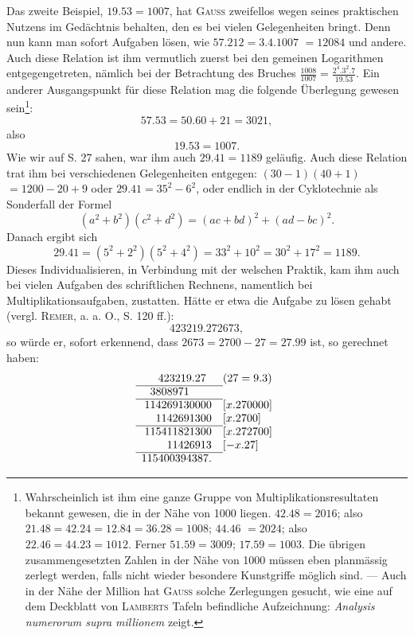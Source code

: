 Das zweite Beispiel, $19\mathord{.}53=1007$, hat \textsc{Gauss} zweifellos wegen seines
praktischen Nutzens im Gedächtnis behalten, den es bei vielen Gelegenheiten
bringt. Denn nun kann man sofort Aufgaben lösen, wie $57\mathord{.}212=3\mathord{.}4\mathord{.}1007$
$=12084$ und andere. Auch diese Relation ist ihm vermutlich zuerst bei den
gemeinen Logarithmen entgegengetreten, nämlich bei der Betrachtung des
Bruches $\frac{1008}{1007}=\frac{2^4\mathord{.}3^2\mathord{.}7}{19\mathord{.}53}$. Ein anderer Ausgangspunkt für diese Relation mag
\clearpage{}
\setcounter{footnote}{0}
\noindent die folgende Überlegung gewesen sein\footnote{Wahrscheinlich ist ihm eine ganze Gruppe von Multiplikationsresultaten bekannt gewesen, die in
der Nähe von 1000 liegen. $42\mathord{.}48=2016$; also $21\mathord{.}48=42\mathord{.}24=12\mathord{.}84=36\mathord{.}28=1008$; $44\mathord{.}46$
$=2024$; also $22\mathord{.}46=44\mathord{.}23=1012$. Ferner $51\mathord{.}59=3009$; $17\mathord{.}59=1003$. Die übrigen zusammengesetzten Zahlen in der Nähe von 1000 müssen eben planmässig zerlegt werden, falls nicht wieder besondere Kunstgriffe möglich sind. — Auch in der Nähe der Million hat \textsc{Gauss} solche Zerlegungen gesucht,
wie eine auf dem Deckblatt von \textsc{Lamberts} Tafeln befindliche Aufzeichnung: \textit{Analysis numerorum supra
millionem} zeigt.}:
\[
57\mathord{.}53=50\mathord{.}60+21=3021,
\]
\noindent also
\[
19\mathord{.}53=1007.
\]
\noindent Wie wir auf S. 27 sahen, war ihm auch $29\mathord{.}41=1189$ geläufig. Auch diese
Relation trat ihm bei verschiedenen Gelegenheiten entgegen: $(30-1)(40+1)$
$=1200-20+9$ oder $29\mathord{.}41=35^2-6^2$, oder endlich in der Cyklotechnie als
Sonderfall der Formel
\[
(a^2+b^2)(c^2+d^2)=(ac+bd)^2+(ad-bc)^2.
\]
\noindent Danach ergibt sich
\[
29\mathord{.}41=(5^2+2^2)(5^2+4^2)=33^2+10^2=30^2+17^2=1189.
\]
\noindent Dieses Individualisieren, in Verbindung mit der welschen Praktik, kam ihm
auch bei vielen Aufgaben des schriftlichen Rechnens, namentlich bei Multiplikationsaufgaben, zustatten. Hätte er etwa die Aufgabe zu lösen gehabt
(vergl. \textsc{Remer}, a. a. O., S. 120 ff.):
\[
423219\mathord{.}272673,
\]
\noindent so würde er, sofort erkennend, dass $2673=2700-27=27\mathord{.}99$ ist, so gerechnet haben:
\[
\begin{array}{r@{\quad}l}
423219\mathord{.}27\hphantom{0}&(27=9\mathord{.}3)\\\cline{1-1}
3808971\hphantom{0000}&\\\cline{1-1}
114269130000&[x\mathord{.}270000]\\
1142691300&[x\mathord{.}2700]\\\cline{1-1}
115411821300&[x\mathord{.}272700]\\
11426913&[-x\mathord{.}27]\\\cline{1-1}
115400394387.&
\end{array}
\]
